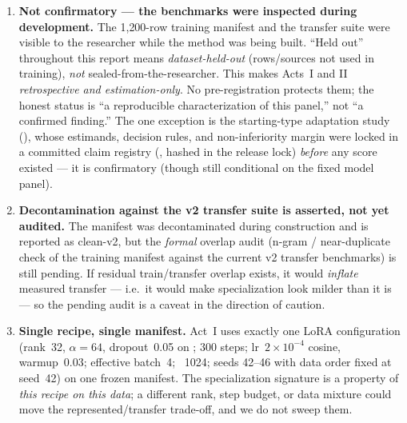 \begin{enumerate}[leftmargin=1.6em,itemsep=2pt]
  \item \textbf{Not confirmatory --- the benchmarks were inspected during development.} The 1{,}200-row training manifest and the transfer suite were visible to the researcher while the method was being built. ``Held out'' throughout this report means \emph{dataset-held-out} (rows/sources not used in training), \emph{not} sealed-from-the-researcher. This makes Acts~I and II \emph{retrospective and estimation-only}. No pre-registration protects them; the honest status is ``a reproducible characterization of this panel,'' not ``a confirmed finding.'' The one exception is the starting-type adaptation study (), whose estimands, decision rules, and non-inferiority margin were locked in a committed claim registry (, hashed in the release lock) \emph{before} any score existed --- it is confirmatory (though still conditional on the fixed model panel).

  \item \textbf{Decontamination against the v2 transfer suite is asserted, not yet audited.} The manifest was decontaminated during construction and is reported as clean-v2, but the \emph{formal} overlap audit (n-gram / near-duplicate check of the training manifest against the current v2 transfer benchmarks) is still pending. If residual train/transfer overlap exists, it would \emph{inflate} measured transfer --- i.e.\ it would make specialization look milder than it is --- so the pending audit is a caveat in the direction of caution.

  \item \textbf{Single recipe, single manifest.} Act~I uses exactly one LoRA configuration (rank~32, $\alpha{=}64$, dropout~0.05 on ; 300 steps; lr~$2\!\times\!10^{-4}$ cosine, warmup~0.03; effective batch~4; ~1024; seeds 42--46 with data order fixed at seed~42) on one frozen manifest. The specialization signature is a property of \emph{this recipe on this data}; a different rank, step budget, or data mixture could move the represented/transfer trade-off, and we do not sweep them.


\end{enumerate}
